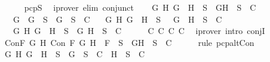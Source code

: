 \begin{isabellebody}
\ \ \ \ \isamarkupfalse%
\ pcpS\ \isamarkupfalse%
\ {\isacharparenleft}iprover\ elim{\isacharcolon}\ conjunct{}{\isacharparenright}\isanewline
\ \ \isamarkupfalse%
\ {\isachardoublequoteopen}{\isacharparenleft}{\isasymforall}G\ H{\isachardot}\ G\ \isactrlbold {\isasymand}\ H\ {\isasymin}\ S\ {\isasymlongrightarrow}\ {\isacharbraceleft}G{\isacharcomma}H{\isacharbraceright}\ {\isasymunion}\ S\ {\isasymin}\ C{\isacharparenright}\isanewline
\ \ {\isasymand}\ {\isacharparenleft}{\isasymforall}G{\isachardot}\ \isactrlbold {\isasymnot}\ {\isacharparenleft}\isactrlbold {\isasymnot}G{\isacharparenright}\ {\isasymin}\ S\ {\isasymlongrightarrow}\ {\isacharbraceleft}G{\isacharbraceright}\ {\isasymunion}\ S\ {\isasymin}\ C{\isacharparenright}\isanewline
\ \ {\isasymand}\ {\isacharparenleft}{\isasymforall}G\ H{\isachardot}\ \isactrlbold {\isasymnot}{\isacharparenleft}G\ \isactrlbold {\isasymor}\ H{\isacharparenright}\ {\isasymin}\ S\ {\isasymlongrightarrow}\ {\isacharbraceleft}\isactrlbold {\isasymnot}\ G{\isacharcomma}\ \isactrlbold {\isasymnot}\ H{\isacharbraceright}\ {\isasymunion}\ S\ {\isasymin}\ C{\isacharparenright}\isanewline
\ \ {\isasymand}\ {\isacharparenleft}{\isasymforall}G\ H{\isachardot}\ \isactrlbold {\isasymnot}{\isacharparenleft}G\ \isactrlbold {\isasymrightarrow}\ H{\isacharparenright}\ {\isasymin}\ S\ {\isasymlongrightarrow}\ {\isacharbraceleft}G{\isacharcomma}\isactrlbold {\isasymnot}\ H{\isacharbraceright}\ {\isasymunion}\ S\ {\isasymin}\ C{\isacharparenright}{\isachardoublequoteclose}\isanewline
\ \ \ \ \isamarkupfalse%
\ C{}\ C{}\ C{}\ C{}\ \isamarkupfalse%
\ {\isacharparenleft}iprover\ intro{\isacharcolon}\ conjI{\isacharparenright}\isanewline
\ \ \isamarkupfalse%
\ \isamarkupfalse%
\ Con{\isacharcolon}{\isachardoublequoteopen}{\isasymforall}F\ G\ H{\isachardot}\ Con\ F\ G\ H\ {\isasymlongrightarrow}\ F\ {\isasymin}\ S\ {\isasymlongrightarrow}\ {\isacharbraceleft}G{\isacharcomma}H{\isacharbraceright}\ {\isasymunion}\ S\ {\isasymin}\ C{\isachardoublequoteclose}\isanewline
\ \ \ \ \isamarkupfalse%
\ {\isacharparenleft}rule\ pcp{\isacharunderscore}alt{}Con{\isacharparenright}\isanewline
\ \ \isamarkupfalse%
\ {\isachardoublequoteopen}{\isacharparenleft}{\isasymforall}G\ H{\isachardot}\ G\ \isactrlbold {\isasymor}\ H\ {\isasymin}\ S\ {\isasymlongrightarrow}\ {\isacharbraceleft}G{\isacharbraceright}\ {\isasymunion}\ S\ {\isasymin}\ C\ {\isasymor}\ {\isacharbraceleft}H{\isacharbraceright}\ {\isasymunion}\ S\ {\isasymin}\ C{\isacharparenright}\isanewline

\end{isabellebody}
